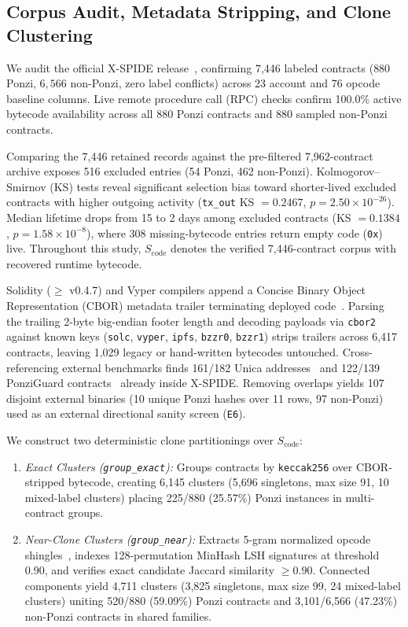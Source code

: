 \documentclass[conference]{IEEEtran}
\begin{document}
\subsection{Corpus Audit, Metadata Stripping, and Clone Clustering}\label{sec:corpus}

We audit the official X-SPIDE release~\cite{pennella2025repo}, confirming 7,446 labeled contracts ($880$ Ponzi, $6{,}566$ non-Ponzi, zero label conflicts) across 23 account and 76 opcode baseline columns. Live remote procedure call (RPC) checks confirm 100.0\% active bytecode availability across all 880 Ponzi contracts and 880 sampled non-Ponzi contracts.

Comparing the 7,446 retained records against the pre-filtered 7,962-contract archive exposes 516 excluded entries (54 Ponzi, 462 non-Ponzi). Kolmogorov--Smirnov (KS) tests reveal significant selection bias toward shorter-lived excluded contracts with higher outgoing activity (\texttt{tx\_out} KS $=0.2467$, $p=2.50\times 10^{-26}$). Median lifetime drops from 15 to 2 days among excluded contracts (KS $=0.1384$, $p=1.58\times 10^{-8}$), where 308 missing-bytecode entries return empty code (\texttt{0x}) live. Throughout this study, $S_{\text{code}}$ denotes the verified 7,446-contract corpus with recovered runtime bytecode.

Solidity ($\ge$ v0.4.7) and Vyper compilers append a Concise Binary Object Representation (CBOR) metadata trailer terminating deployed code~\cite{soliditymetadata}. Parsing the trailing 2-byte big-endian footer length and decoding payloads via \texttt{cbor2} against known keys (\texttt{solc}, \texttt{vyper}, \texttt{ipfs}, \texttt{bzzr0}, \texttt{bzzr1}) strips trailers across 6,417 contracts, leaving 1,029 legacy or hand-written bytecodes untouched. Cross-referencing external benchmarks finds 161/182 Unica addresses~\cite{unica2021ponzi} and 122/139 PonziGuard contracts~\cite{liang2024repo} already inside X-SPIDE\@. Removing overlaps yields 107 disjoint external binaries (10 unique Ponzi hashes over 11 rows, 97 non-Ponzi) used as an external directional sanity screen (\texttt{E6}).

We construct two deterministic clone partitionings over $S_{\text{code}}$:
\begin{enumerate}
\item \emph{Exact Clusters (\texttt{group\_exact}):} Groups contracts by \texttt{keccak256} over CBOR-stripped bytecode, creating 6,145 clusters (5,696 singletons, max size 91, 10 mixed-label clusters) placing 225/880 (25.57\%) Ponzi instances in multi-contract groups.
\item \emph{Near-Clone Clusters (\texttt{group\_near}):} Extracts 5-gram normalized opcode shingles~\cite{broder1997resemblance}, indexes 128-permutation MinHash LSH signatures at threshold 0.90, and verifies exact candidate Jaccard similarity $\ge 0.90$. Connected components yield 4,711 clusters (3,825 singletons, max size 99, 24 mixed-label clusters) uniting 520/880 (59.09\%) Ponzi contracts and 3,101/6,566 (47.23\%) non-Ponzi contracts in shared families.
\end{enumerate}
\end{document}
